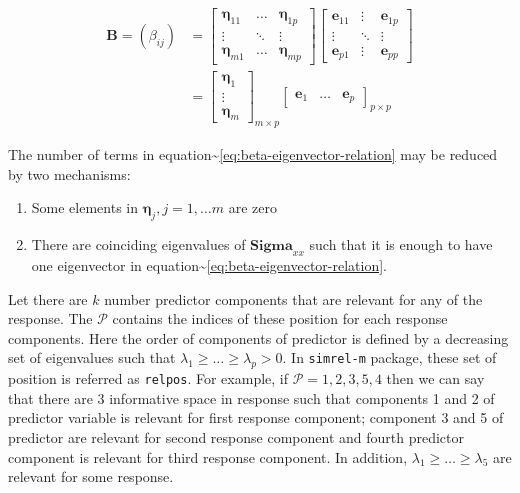 \documentclass[12pt,A4paper,authoryear]{elsarticle} %
\providecommand{\tightlist}{%
  \setlength{\itemsep}{0pt}\setlength{\parskip}{0pt}}
\begin{document}
\begin{align}
\mathbf{B} = \left(\beta_{ij}\right) &= 
  \begin{bmatrix} 
    \boldsymbol{\eta}_{11} & \ldots & \boldsymbol{\eta}_{1p} \\
    \vdots & \ddots & \vdots \\
    \boldsymbol{\eta}_{m1} & \ldots & \boldsymbol{\eta}_{mp}
  \end{bmatrix} 
  \begin{bmatrix} 
    \mathbf{e}_{11} & \vdots & \mathbf{e}_{1p} \\
    \vdots & \ddots & \vdots \\
    \mathbf{e}_{p1} & \vdots & \mathbf{e}_{pp}
  \end{bmatrix} \\ &= 
  \begin{bmatrix}\boldsymbol{\eta}_{1} \\ \vdots \\ \boldsymbol{\eta}_{m}\end{bmatrix}_{m \times p}
  \begin{bmatrix}\mathbf{e}_{1} & \ldots & \mathbf{e}_{p}\end{bmatrix}_{p \times p} 
\label{eq:beta-eigenvector-relation}
\end{align}

The number of terms in
equation\textasciitilde{}\eqref{eq:beta-eigenvector-relation} may be
reduced by two mechanisms:

\begin{enumerate}
\def\labelenumi{\alph{enumi})}
\tightlist
\item
  Some elements in \(\boldsymbol{\eta}_j, j = 1, \ldots m\) are zero
\item
  There are coinciding eigenvalues of \(\boldsymbol{Sigma}_{xx}\) such
  that it is enough to have one eigenvector in
  equation\textasciitilde{}\eqref{eq:beta-eigenvector-relation}.
\end{enumerate}

Let there are \(k\) number predictor components that are relevant for
any of the response. The \(\mathcal{P}\) contains the indices of these
position for each response components. Here the order of components of
predictor is defined by a decreasing set of eigenvalues such that
\(\lambda_1 \ge \ldots \ge \lambda_p > 0\). In \texttt{simrel-m}
package, these set of position is referred as \texttt{relpos}. For
example, if \(\mathcal{P} = {{1, 2}, {3, 5}, {4}}\) then we can say that
there are 3 informative space in response such that components 1 and 2
of predictor variable is relevant for first response component;
component 3 and 5 of predictor are relevant for second response
component and fourth predictor component is relevant for third response
component. In addition, \(\lambda_1 \ge \ldots \ge \lambda_5\) are
relevant for some response.
\end{document}
